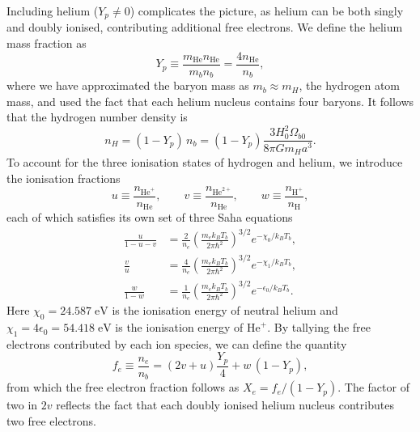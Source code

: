 \documentclass[twocolumn]{aa}
\begin{document}
Including helium ($Y_p \neq 0$) complicates the picture, as helium can be both singly and doubly ionised, contributing additional free electrons. We define the helium mass fraction as
\begin{equation*}
      Y_p \equiv \frac{m_{\mathrm{He}}n_{\mathrm{He}}}{m_b n_b} = \frac{4n_{\mathrm{He}}}{n_b},
\end{equation*}
where we have approximated the baryon mass as $m_b \approx m_H$, the hydrogen atom mass, and used the fact that each helium nucleus contains four baryons. It follows that the hydrogen number density is
\begin{equation*}
      n_H = (1-Y_p)\,n_b = (1-Y_p)\frac{3H_0^2\Omega_{b0}}{8\pi G m_H a^3}.
\end{equation*}
To account for the three ionisation states of hydrogen and helium, we introduce the ionisation fractions
\begin{equation*}
u \equiv \frac{n_{\mathrm{He}^+}}{n_{\mathrm{He}}}, \qquad
v \equiv \frac{n_{\mathrm{He}^{2+}}}{n_{\mathrm{He}}}, \qquad
w \equiv \frac{n_{\mathrm{H}^+}}{n_{\mathrm{H}}},
\end{equation*}
each of which satisfies its own set of three Saha equations
\begin{align}
      \frac{u}{1-u-v} &= \frac{2}{n_e}\left(\frac{m_e k_BT_b}{2\pi\hbar^2}\right)^{3/2}e^{-\chi_0/k_BT_b},\label{eq:saha with Helium 1}\\
      \frac{v}{u}     &= \frac{4}{n_e}\left(\frac{m_e k_BT_b}{2\pi\hbar^2}\right)^{3/2}e^{-\chi_1/k_BT_b},\label{eq:saha with Helium 2}\\
      \frac{w}{1-w}   &= \frac{1}{n_e}\left(\frac{m_e k_BT_b}{2\pi\hbar^2}\right)^{3/2}e^{-\epsilon_0/k_BT_b}.\label{eq:saha with Helium 3}
\end{align}
Here $\chi_0 = 24.587\;\mathrm{eV}$ is the ionisation energy of neutral helium and $\chi_1 = 4\epsilon_0 = 54.418\;\mathrm{eV}$ is the ionisation energy of $\mathrm{He}^+$. By tallying the free electrons contributed by each ion species, we can define the quantity
\begin{equation}
      f_e \equiv \frac{n_e}{n_b} = \left(2v + u\right)\frac{Y_p}{4} + w\,(1-Y_p),\label{eq:f_e}
\end{equation}
from which the free electron fraction follows as $X_e = f_e/(1-Y_p)$. The factor of two in $2v$ reflects the fact that each doubly ionised helium nucleus contributes two free electrons.\\
\end{document}
